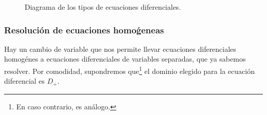 \begin{figure}[H]
\centering
{}
\caption{Diagrama de los tipos de ecuaciones diferenciales.}
\label{diag:tipos_ed}
\end{figure}

\subsubsection{Resolución de ecuaciones homoǵeneas}
Hay un cambio de variable que nos permite llevar ecuaciones diferenciales homogénes a ecuaciones diferenciales de variables separadas, que ya sabemos resolver. Por comodidad, supondremos que\footnote{En caso contrario, es análogo.} el dominio elegido para la ecuación diferencial es $D_+$.\\

